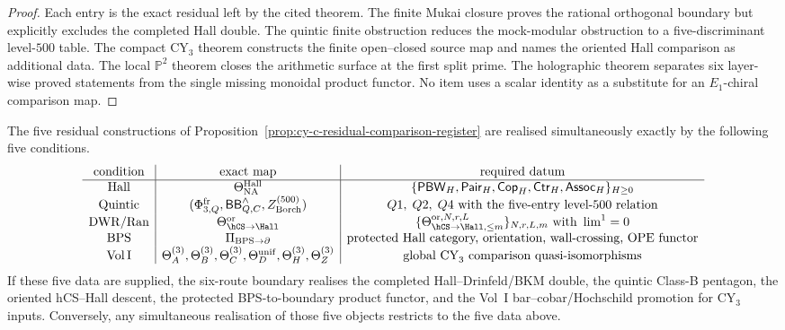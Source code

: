 \begin{proof}
Each entry is the exact residual left by the cited theorem. The finite
Mukai closure proves the rational orthogonal boundary but explicitly
excludes the completed Hall double. The quintic finite obstruction reduces the
mock-modular obstruction to a five-discriminant level-$500$ table. The
compact CY$_3$ theorem constructs the finite open--closed source map and
names the oriented Hall comparison as additional data. The local
$\mathbb P^2$ theorem closes the arithmetic surface at the first split
prime. The holographic theorem separates six layer-wise proved
statements from the single missing monoidal product functor. No item
uses a scalar identity as a substitute for an \(E_1\)-chiral comparison
map.
\end{proof}

\begin{theorem}
\label{thm:cy-c-five-condition-realisation-criterion}
The five residual constructions of
Proposition~\ref{prop:cy-c-residual-comparison-register} are realised
simultaneously exactly by the following five conditions.
\[
\begin{array}{c|c|c}
\text{condition} & \text{exact map} & \text{required datum}\\
\hline
\mathrm{Hall} &
\Theta_{\mathrm{NA}}^{\mathrm{Hall}} &
\{\mathsf{PBW}_H,\mathsf{Pair}_H,\mathsf{Cop}_H,
 \mathsf{Ctr}_H,\mathsf{Assoc}_H\}_{H\geq0}\\
\mathrm{Quintic} &
(\Phi_{3,Q}^{\mathrm{fr}},\mathsf{BB}^{\wedge}_{Q,C},
 Z_{\mathrm{Borch}}^{(500)}) &
Q1,\;Q2,\;Q4\text{ with the five-entry level-}500\text{ relation}\\
\mathrm{DWR/Ran} &
\Theta_{\hCS\to\Hall}^{\mathrm{or}} &
\{\Theta_{\hCS\to\Hall,\leq m}^{\mathrm{or},N,r,L}\}_{N,r,L,m}
\text{ with }\lim^1=0\\
\mathrm{BPS} &
\Pi_{\mathrm{BPS}\to\partial} &
\text{protected Hall category, orientation, wall-crossing, OPE functor}\\
\mathrm{Vol\,I} &
\Theta_A^{(3)},\Theta_B^{(3)},\Theta_C^{(3)},
\Theta_D^{\mathrm{unif}},\Theta_H^{(3)},\Theta_Z^{(3)} &
\text{global CY}_3\text{ comparison quasi-isomorphisms}
\end{array}
\]
If these five data are supplied, the six-route boundary
realises the completed Hall--Drinfeld/BKM double, the quintic
Class-B pentagon, the oriented hCS--Hall descent, the protected
BPS-to-boundary product functor, and the Vol~I bar--cobar/Hochschild
promotion for CY$_3$ inputs. Conversely, any simultaneous realisation
of those five objects restricts to the five data above.
\end{theorem}

